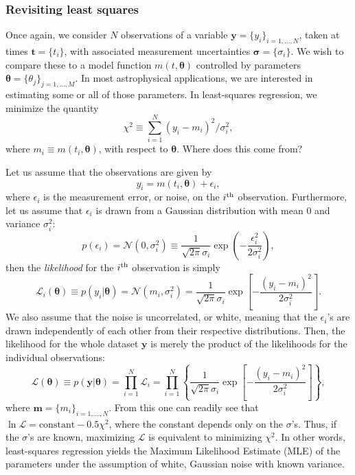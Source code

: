 \documentclass[letterpaper]{ar-1col}
\newcommand{\meanparams}{\ensuremath{\boldsymbol{\theta}}}
\begin{document}
\subsubsection{Revisiting least squares}\label{sec:lsq}

Once again, we consider $N$ observations of a variable $\mathbf{y} = \{ y_i\}_{i=1, \ldots, N}$, taken at times $\mathbf{t} = \{ t_i\}$, with associated measurement uncertainties $\boldsymbol{\sigma}=\{\sigma_i\}$. We wish to compare these to a model function $m(t,\meanparams)$ controlled by parameters $\meanparams=\{\theta_j\}_{j=1,\ldots,M}$. In most astrophysical applications, we are interested in estimating some or all of those parameters. In least-squares regression, we minimize the quantity
\begin{equation}
  \chi^2 \equiv\sum_{i=1}^N (y_i-m_i)^2/\sigma^2_i,
\end{equation}
where $m_i \equiv m(t_i,\meanparams)$, with respect to $\meanparams$. Where does this come from?

Let us assume that the observations are given by
\begin{equation}
  y_i=m(t_i,\meanparams)+\epsilon_i,
\end{equation}
where $\epsilon_i$ is the measurement error, or noise, on the $i^{\rm th}$ observation. Furthermore, let us assume that $\epsilon_i$ is drawn from a Gaussian distribution with mean $0$ and variance $\sigma_i^2$:
\begin{equation}
  p(\epsilon_i)=\mathcal{N}(0,\sigma_i^2) \equiv \frac{1}{\sqrt{2\pi} \sigma_i} \exp\left(-\frac{\epsilon_i^2}{2\sigma_i^2} \right),
\end{equation}
then the \emph{likelihood} for the $i^{\rm th}$ observation is simply
\begin{equation}
  \mathcal{L}_i (\meanparams) \equiv p(y_i|\meanparams)=\mathcal{N}(m_i,\sigma_i^2) =\frac{1}{\sqrt{2\pi} \sigma_i} \exp\left[-\frac{(y_i-m_i)^2}{2\sigma_i^2} \right].
\end{equation}
We also assume that the noise is uncorrelated, or white, meaning that the $\epsilon_i$'s are drawn independently of each other from their respective distributions. Then, the likelihood for the whole dataset $\mathbf{y}$ is merely the product of the likelihoods for the individual observations:
\begin{equation}
  \mathcal{L} (\meanparams) \equiv p(\mathbf{y}|\meanparams) = \prod_{i=1}^N \mathcal{L}_i = \prod_{i=1}^N \left\{ \frac{1}{\sqrt{2\pi} \sigma_i}
  \exp\left[-\frac{(y_i-m_i)^2}{2\sigma_i^2} \right] \right\},
\end{equation}
where $\mathbf{m}=\{m_i\}_{i=1,\ldots,N}$. From this one can readily see that $\ln \mathcal{L} = \mathrm{constant} - 0.5 \chi^2$, where the constant depends only on the $\sigma$'s. Thus, if the $\sigma$'s are known, maximizing $\mathcal{L}$ is equivalent to minimizing $\chi^2$. In other words, least-squares regression yields the Maximum Likelihood Estimate (MLE) of the parameters under the assumption of white, Gaussian noise with known variance.
\end{document}
